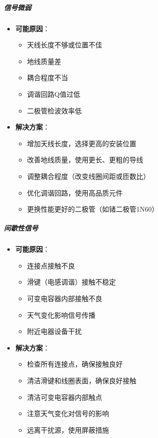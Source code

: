 \documentclass[12pt,UTF8]{ctexbook}
\begin{document}
\subparagraph{信号微弱}

\begin{itemize}[leftmargin=3.5em]
    \item \textbf{可能原因}：
    \begin{itemize}
        \item 天线长度不够或位置不佳
        \item 地线质量差
        \item 耦合程度不当
        \item 调谐回路Q值过低
        \item 二极管检波效率低
    \end{itemize}
    \item \textbf{解决方案}：
    \begin{itemize}
        \item 增加天线长度，选择更高的安装位置
        \item 改善地线质量，使用更长、更粗的导线
        \item 调整耦合程度（改变线圈间距或匝数比）
        \item 优化调谐回路，使用高品质元件
        \item 更换性能更好的二极管（如锗二极管1N60）
    \end{itemize}
\end{itemize}

\subparagraph{间歇性信号}

\begin{itemize}[leftmargin=3.5em]
    \item \textbf{可能原因}：
    \begin{itemize}
        \item 连接点接触不良
        \item 滑键（电感调谐）接触不稳定
        \item 可变电容器内部接触不良
        \item 天气变化影响信号传播
        \item 附近电器设备干扰
    \end{itemize}
    \item \textbf{解决方案}：
    \begin{itemize}
        \item 检查所有连接点，确保接触良好
        \item 清洁滑键和线圈表面，确保良好接触
        \item 清洁可变电容器内部触点
        \item 注意天气变化对信号的影响
        \item 远离干扰源，使用屏蔽措施
    \end{itemize}
\end{itemize}
\end{document}
